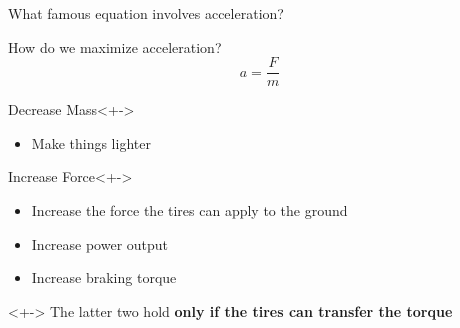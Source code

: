\documentclass[aspectratio=169]{beamer}
\begin{document}
\begin{frame}{What famous equation involves acceleration?}

\end{frame}

\begin{frame}{How do we maximize acceleration?}
    \begin{equation*}
        a = \frac{F}{m}
    \end{equation*}

    \begin{block}{Decrease Mass}<+->
        \begin{itemize}
            \item Make things lighter
        \end{itemize}
    \end{block}

    \begin{block}{Increase Force}<+->
        \begin{itemize}
            \item<+-> Increase the force the tires can apply to the ground
            \item<+-> Increase power output
            \item<+-> Increase braking torque
        \end{itemize}
    \end{block}

    \begin{alertblock}{}<+->
        The latter two hold \textbf{only if the tires can transfer the torque}
    \end{alertblock}
\end{frame}
\end{document}
